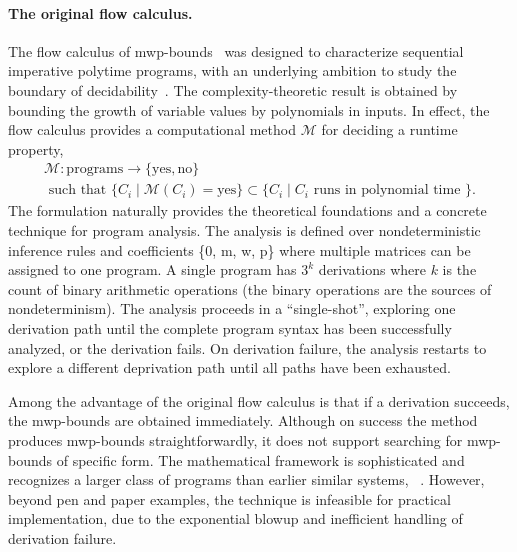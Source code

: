 \paragraph*{The original flow calculus.}
The flow calculus of mwp-bounds~\cite{jones2009} was designed to characterize sequential imperative polytime programs,
with an underlying ambition to study the boundary of decidability~\cite{kristiansen2017}.
The complexity-theoretic result is obtained by bounding the growth of variable values by polynomials in inputs.
In effect, the flow calculus provides a computational method \(\mathcal{M}\) for deciding a runtime property,
\begin{gather*}
\mathcal{M}: \text{programs} \rightarrow \{ \text{yes}, \text{no} \} \\
\text{ such that } \{C_i \mid \mathcal{M}(C_i) = \text{yes} \} \subset \{ C_i \mid C_i \text{ runs in polynomial time } \}.
\end{gather*}
The formulation naturally provides the theoretical foundations and a concrete technique for program analysis.
The analysis is defined over nondeterministic inference rules and coefficients \{0, m, w, p\} where multiple matrices can be assigned to one program.
A single program has \(3^k\) derivations where \(k\) is the count of binary arithmetic operations (the binary operations are the sources of nondeterminism).
The analysis proceeds in a \enquote{single-shot}, exploring one derivation path until the complete program syntax has been successfully analyzed, or the derivation fails.
On derivation failure, the analysis restarts to explore a different deprivation path until all paths have been exhausted.

Among the advantage of the original flow calculus
is that if a derivation succeeds, the mwp-bounds are obtained immediately.
Although on success the method produces mwp-bounds straightforwardly, it does not support searching for mwp-bounds of specific form.
The mathematical framework is sophisticated and recognizes a larger class of programs than earlier similar systems, \eg~\cite{niggl2006}.
However, beyond pen and paper examples, the technique is infeasible for practical implementation, due to the exponential blowup and inefficient handling of derivation failure.

